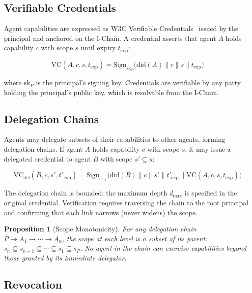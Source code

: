 \documentclass[11pt,a4paper]{article}
\newtheorem{proposition}[theorem]{Proposition}
\begin{document}
\subsection{Verifiable Credentials}

Agent capabilities are expressed as W3C Verifiable Credentials~\cite{w3c-vc2022} issued by the principal and anchored on the I-Chain. A credential asserts that agent $A$ holds capability $c$ with scope $s$ until expiry $t_{\text{exp}}$:

\begin{equation}\label{eq:vc}
    \text{VC}(A, c, s, t_{\text{exp}}) = \text{Sign}_{\text{sk}_P}\big(\text{did}(A) \| c \| s \| t_{\text{exp}}\big)
\end{equation}

where $\text{sk}_P$ is the principal's signing key. Credentials are verifiable by any party holding the principal's public key, which is resolvable from the I-Chain.

\subsection{Delegation Chains}

Agents may delegate subsets of their capabilities to other agents, forming delegation chains. If agent $A$ holds capability $c$ with scope $s$, it may issue a delegated credential to agent $B$ with scope $s' \subseteq s$:

\begin{equation}\label{eq:delegation}
    \text{VC}_{\text{del}}(B, c, s', t'_{\text{exp}}) = \text{Sign}_{\text{sk}_A}\big(\text{did}(B) \| c \| s' \| t'_{\text{exp}} \| \text{VC}(A, c, s, t_{\text{exp}})\big)
\end{equation}

The delegation chain is bounded: the maximum depth $d_{\max}$ is specified in the original credential. Verification requires traversing the chain to the root principal and confirming that each link narrows (never widens) the scope.

\begin{proposition}[Scope Monotonicity]
For any delegation chain $P \to A_1 \to \cdots \to A_n$, the scope at each level is a subset of its parent: $s_n \subseteq s_{n-1} \subseteq \cdots \subseteq s_1 \subseteq s_P$. No agent in the chain can exercise capabilities beyond those granted by its immediate delegator.
\end{proposition}

\subsection{Revocation}
\end{document}

